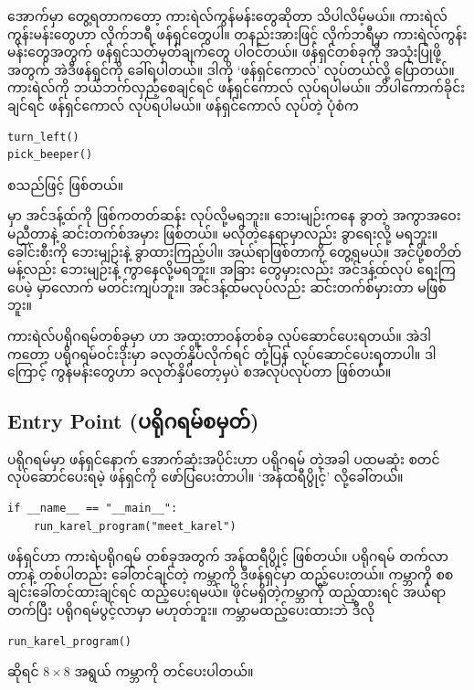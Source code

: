  အောက်မှာ တွေ့ရတာကတော့ ကားရဲလ်ကွန်မန်းတွေဆိုတာ သိပါလိမ့်မယ်။ ကားရဲလ်ကွန်းမန်းတွေဟာ  လိုက်ဘရီ ဖန်ရှင်တွေပါ။ တနည်းအားဖြင့်  လိုက်ဘရီမှာ ကားရဲလ်ကွန်းမန်းတွေအတွက် ဖန်ရှင်သတ်မှတ်ချက်တွေ ပါဝင်တယ်။ ဖန်ရှင်တစ်ခုကို အသုံးပြုဖို့အတွက် အဲဒီဖန်ရှင်ကို ခေါ်ရပါတယ်။ ဒါကို   ‘ဖန်ရှင်ကောလ်’ လုပ်တယ်လို့ ပြောတယ်။ ကားရဲလ်ကို ဘယ်ဘက်လှည့်စေချင်ရင်  ဖန်ရှင်ကောလ် လုပ်ရပါမယ်။ ဘိပါကောက်ခိုင်းချင်ရင်  ဖန်ရှင်ကောလ် လုပ်ရပါမယ်။ ဖန်ရှင်ကောလ် လုပ်တဲ့ ပုံစံက
%
\setlength{\fboxsep}{0pt}
\begin{verbatim}
turn_left()
pick_beeper()
\end{verbatim}
စသည်ဖြင့် ဖြစ်တယ်။

\begin{mytcbox}
 မှာ အင်ဒန့်ထ်ကို ဖြစ်ကတတ်ဆန်း လုပ်လို့မရဘူး။ ဘေးမျဉ်းကနေ ခွာတဲ့ အကွာအဝေး မညီတာနဲ့ ဆင်းတက်စ်အမှား ဖြစ်တယ်။ မလိုတဲ့နေရာမှာလည်း ခွာရေးလို့ မရဘူး။ ခေါင်းစီးကို ဘေးမျဉ်းနဲ့ ခွာထားကြည့်ပါ။ အယ်ရာဖြစ်တာကို တွေ့ရမယ်။ အင်ပို့စတိတ်မန့်လည်း ဘေးမျဉ်းနဲ့ ကွာနေလို့မရဘူး။ အခြား  တွေမှားလည်း အင်ဒန့်ထ်လုပ် ရေးကြပေမဲ့  မှာလောက် မတင်းကျပ်ဘူး။ အင်ဒန့်ထ်မလုပ်လည်း ဆင်းတက်စ်မှားတာ မဖြစ်ဘူး။
\end{mytcbox}

ကားရဲလ်ပရိုဂရမ်တစ်ခုမှာ  ဟာ  အထူးတာဝန်တစ်ခု လုပ်ဆောင်ပေးရတယ်။ အဲဒါကတော့ ပရိုဂရမ်ဝင်းဒိုးမှာ  ခလုတ်နှိပ်လိုက်ရင် တုံ့ပြန် လုပ်ဆောင်ပေးရတာပါ။ ဒါကြောင့် ကွန်မန်းတွေဟာ ခလုတ်နှိပ်တော့မှပဲ စအလုပ်လုပ်တာ ဖြစ်တယ်။

\subsection*{Entry Point (ပရိုဂရမ်စမှတ်)}
 ပရိုဂရမ်မှာ  ဖန်ရှင်နောက် အောက်ဆုံးအပိုင်းဟာ ပရိုဂရမ်  တဲ့အခါ ပထမဆုံး စတင်လုပ်ဆောင်ပေးရမဲ့ ဖန်ရှင်ကို ဖော်ပြပေးတာပါ။ ‘အန်ထရီပွိုင့်’ လို့ခေါ်တယ်။ 
%
\setlength{\fboxsep}{0pt}
\begin{verbatim}
if __name__ == "__main__":
    run_karel_program("meet_karel")
\end{verbatim}
 ဖန်ရှင်ဟာ ကားရဲပရိုဂရမ် တစ်ခုအတွက် အန်ထရီပွိုင့် ဖြစ်တယ်။  ပရိုဂရမ် တက်လာတာနဲ့ တစ်ပါတည်း ခေါ်တင်ချင်တဲ့ ကမ္ဘာကို ဒီဖန်ရှင်မှာ ထည့်ပေးတယ်။  ကမ္ဘာကို စစချင်းခေါ်တင်ထားချင်ရင်  ထည့်ပေးရမယ်။  ဖိုင်မရှိတဲ့ကမ္ဘာကို ထည့်ထားရင် အယ်ရာတက်ပြီး ပရိုဂရမ်ပွင့်လာမှာ မဟုတ်ဘူး။ ကမ္ဘာမထည့်ပေးထားဘဲ ဒီလို
%
\setlength{\fboxsep}{0pt}
\begin{verbatim}
run_karel_program()
\end{verbatim}
%
ဆိုရင် $8 \times 8$ အရွယ်  ကမ္ဘာကို တင်ပေးပါတယ်။

